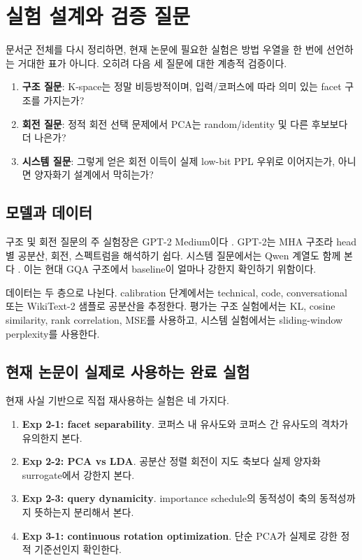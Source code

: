 \section{실험 설계와 검증 질문}

문서군 전체를 다시 정리하면, 현재 논문에 필요한 실험은 방법 우열을 한 번에 선언하는 거대한 표가 아니다. 오히려 다음 세 질문에 대한 계층적 검증이다.

\begin{enumerate}
\item \textbf{구조 질문}: K-space는 정말 비등방적이며, 입력/코퍼스에 따라 의미 있는 facet 구조를 가지는가?
\item \textbf{회전 질문}: 정적 회전 선택 문제에서 PCA는 random/identity 및 다른 후보보다 더 나은가?
\item \textbf{시스템 질문}: 그렇게 얻은 회전 이득이 실제 low-bit PPL 우위로 이어지는가, 아니면 양자화기 설계에서 막히는가?
\end{enumerate}

\subsection{모델과 데이터}

구조 및 회전 질문의 주 실험장은 GPT-2 Medium이다 \citep{radford2019language}. GPT-2는 MHA 구조라 head별 공분산, 회전, 스펙트럼을 해석하기 쉽다. 시스템 질문에서는 Qwen 계열도 함께 본다 \citep{qwen2024qwen25}. 이는 현대 GQA 구조에서 baseline이 얼마나 강한지 확인하기 위함이다.

데이터는 두 층으로 나뉜다. calibration 단계에서는 technical, code, conversational 또는 WikiText-2 샘플로 공분산을 추정한다. 평가는 구조 실험에서는 KL, cosine similarity, rank correlation, MSE를 사용하고, 시스템 실험에서는 sliding-window perplexity를 사용한다.

\subsection{현재 논문이 실제로 사용하는 완료 실험}

현재 사실 기반으로 직접 재사용하는 실험은 네 가지다.

\begin{enumerate}
\item \textbf{Exp 2-1: facet separability}. 코퍼스 내 유사도와 코퍼스 간 유사도의 격차가 유의한지 본다.
\item \textbf{Exp 2-2: PCA vs LDA}. 공분산 정렬 회전이 지도 축보다 실제 양자화 surrogate에서 강한지 본다.
\item \textbf{Exp 2-3: query dynamicity}. importance schedule의 동적성이 축의 동적성까지 뜻하는지 분리해서 본다.
\item \textbf{Exp 3-1: continuous rotation optimization}. 단순 PCA가 실제로 강한 정적 기준선인지 확인한다.
\end{enumerate}

